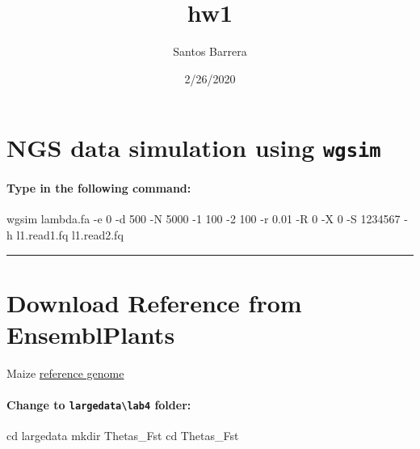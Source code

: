 \documentclass[]{article}
\title{hw1}
\author{Santos Barrera}
\date{2/26/2020}
\newenvironment{Shaded}{\begin{snugshade}}{\end{snugshade}}
\newcommand{\BuiltInTok}[1]{#1}
\newcommand{\ExtensionTok}[1]{#1}
\newcommand{\FunctionTok}[1]{\textcolor[rgb]{0.00,0.00,0.00}{#1}}
\newcommand{\NormalTok}[1]{#1}
\let\oldparagraph\paragraph
\renewcommand{\paragraph}[1]{\oldparagraph{#1}\mbox{}}
\begin{document}
\maketitle

\hypertarget{ngs-data-simulation-using-wgsim}{%
\section{\texorpdfstring{NGS data simulation using
\texttt{wgsim}}{NGS data simulation using wgsim}}\label{ngs-data-simulation-using-wgsim}}

\hypertarget{type-in-the-following-command}{%
\paragraph{Type in the following
command:}\label{type-in-the-following-command}}

\begin{Shaded}
\begin{Highlighting}[]
\ExtensionTok{wgsim}\NormalTok{ lambda.fa -e 0 -d 500 -N 5000 -1 100 -2 100 -r 0.01  -R 0 -X 0 -S 1234567 -h l1.read1.fq l1.read2.fq}
\end{Highlighting}
\end{Shaded}

\begin{center}\rule{0.5\linewidth}{0.5pt}\end{center}

\hypertarget{download-reference-from-ensemblplants}{%
\section{Download Reference from
EnsemblPlants}\label{download-reference-from-ensemblplants}}

Maize \href{https://plants.ensembl.org/Zea_mays/Info/Index}{reference
genome}

\hypertarget{change-to-largedatalab4-folder}{%
\paragraph{\texorpdfstring{Change to
\texttt{largedata\textbackslash{}lab4}
folder:}{Change to largedata\textbackslash{}lab4 folder:}}\label{change-to-largedatalab4-folder}}

\begin{Shaded}
\begin{Highlighting}[]
\BuiltInTok{cd}\NormalTok{ largedata}
\FunctionTok{mkdir}\NormalTok{ Thetas_Fst}
\BuiltInTok{cd}\NormalTok{ Thetas_Fst}
\end{Highlighting}
\end{Shaded}
\end{document}
